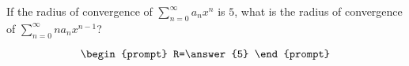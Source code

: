 \documentclass{ximera}
\author{Gregory Hartman \and Matthew Carr}
\begin{document}
\begin{exercise}




If the radius of convergence of $\sum_{n=0}^\infty a_nx^n$ is $5$, what is the radius of convergence of $\sum_{n=0}^\infty n a_nx^{n-1}$?

\[
\begin{prompt}
R=\answer{5}
\end{prompt}
\]

\end{exercise}
\end{document}
